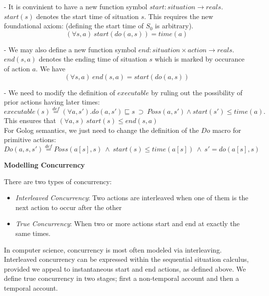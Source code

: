 \documentclass[fleqn]{report}
\begin{document}
- It is convinient to have a new function symbol $start:situation\to reals$.\\ $start(s)$ denotes the start time of situation $s$. This requires the new foundational axiom: (defining the start time of 
$S_0$ is arbitrary).\vspace{-.2cm} \[(\forall s,a) \ start(do(a,s))=time(a)\]

- We may also define a new function symbol $end:situation\times action\to reals$.\\ $end(s,a)$ denotes the ending time of situation $s$ which is marked by occurance of action $a$. We have\vspace{-.2cm} \[(\forall s,a) \ end(s,a)=start(do(a,s))\]

- We need to modify the definition of $executable$ by ruling out the possibility of prior actions having later times:\vspace{-.3cm}
\[executable(s) \stackrel{def}{=} (\forall a,s').do(a,s')\sqsubseteq s \ \supset \ Poss(a,s')\land start(s')\leq time(a). \]
This ensures that $(\forall a,s) \ start(s)\leq end(s,a)$\\
 
For Golog semantics, we just need to change the definition of the $Do$ macro for primitive actions:\vspace{-.3cm}
\[Do(a,s,s')\stackrel{def}{=}Poss(a[s],s) \ \land \ start(s)\leq time(a[s]) \ \land \ s'=do(a[s],s)\]

\textbf{Modelling Concurrency}

There are two types of concurrency:
\vspace{-.1cm} 
\begin{itemize}
\itemsep-.3em
 \item \emph{Interleaved Concurrency}: Two actions are interleaved when one of them is the next action to occur after the other 
 \item \emph{True Concurrency}: When two or more actions start and end at exactly the same times.
\end{itemize}
\vspace{-.1cm}

In computer science, concurrency is most often modeled via interleaving. Interleaved concurrency can be expressed within the sequential situation calculus, provided
we appeal to instantaneous start and end actions, as defined above. We define true concurrency in two stages; first a non-temporal account and then a temporal account.\\
\end{document}
